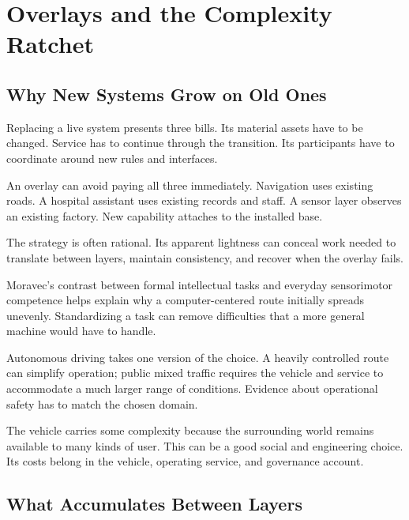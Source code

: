 \section{Overlays and the Complexity Ratchet}

\subsection{Why New Systems Grow on Old Ones}


Replacing a live system presents three bills. Its material assets have to be changed. Service has to continue through the transition. Its participants have to coordinate around new rules and interfaces.

An overlay can avoid paying all three immediately. Navigation uses existing roads. A hospital assistant uses existing records and staff. A sensor layer observes an existing factory. New capability attaches to the installed base.

The strategy is often rational. Its apparent lightness can conceal work needed to translate between layers, maintain consistency, and recover when the overlay fails.


Moravec's contrast between formal intellectual tasks and everyday sensorimotor competence helps explain why a computer-centered route initially spreads unevenly.\cite{moravec1988} Standardizing a task can remove difficulties that a more general machine would have to handle.

Autonomous driving takes one version of the choice. A heavily controlled route can simplify operation; public mixed traffic requires the vehicle and service to accommodate a much larger range of conditions. Evidence about operational safety has to match the chosen domain.\cite{kalra2016}

The vehicle carries some complexity because the surrounding world remains available to many kinds of user. This can be a good social and engineering choice. Its costs belong in the vehicle, operating service, and governance account.

\subsection{What Accumulates Between Layers}


